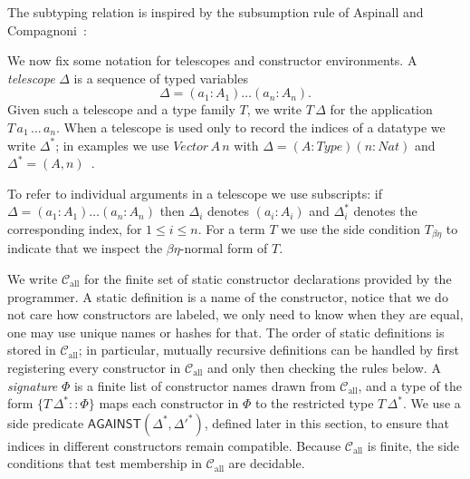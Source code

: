 \documentclass[a4paper, anonymous, UKenglish,cleveref, autoref, thm-restate]{lipics-v2021}
\begin{document}
The subtyping relation is inspired by the subsumption rule of Aspinall and Compagnoni~\cite{AspinallCompagnoni}:
\begin{center}
\begin{mathpar}
\end{mathpar}
\end{center}

We now fix some notation for telescopes and constructor environments. A \emph{telescope} $\Delta$ is a sequence of typed variables
\[
  \Delta = (a_{1} : A_{1}) \dots (a_{n} : A_{n}).
\]
Given such a telescope and a type family $T$, we write $T\,\Delta$ for the application $T\,a_{1}\,\dots\,a_{n}$. When a telescope is used only to record the indices of a datatype we write $\Delta^{*}$; in examples we use $Vector\,A\,n$ with $\Delta = (A : Type)(n : Nat)$ and $\Delta^{*} = (A,n)$~\cite{Norell2007TowardsAP}.

To refer to individual arguments in a telescope we use subscripts: if $\Delta = (a_{1} : A_{1})\dots(a_{n} : A_{n})$ then $\Delta_i$ denotes $(a_i : A_i)$ and $\Delta^{*}_{i}$ denotes the corresponding index, for $1 \leq i \leq n$. For a term $T$ we use the side condition $T_{\beta\eta}$ to indicate that we inspect the $\beta\eta$-normal form of $T$.

We write $\mathcal{C}_{\text{all}}$ for the finite set of static constructor declarations provided by the programmer. 
A static definition is a name of the constructor, notice that we do not care how constructors are labeled, we only need to know when they are equal, one may use unique names or hashes for that.
The order of static definitions is stored in $\mathcal{C}_{\text{all}}$; in particular, mutually recursive definitions can be handled by first registering every constructor in $\mathcal{C}_{\text{all}}$ and only then checking the rules below. A \emph{signature} $\Phi$ is a finite list of constructor names drawn from $\mathcal{C}_{\text{all}}$, and a type of the form $\{T\,\Delta^{*} :: \Phi\}$ maps each constructor in $\Phi$ to the restricted type $T\,\Delta^{*}$. We use a side predicate $\mathsf{AGAINST}(\Delta^{*},\Delta'^{*})$, defined later in this section, to ensure that indices in different constructors remain compatible. Because $\mathcal{C}_{\text{all}}$ is finite, the side conditions that test membership in $\mathcal{C}_{\text{all}}$ are decidable.
\end{document}
